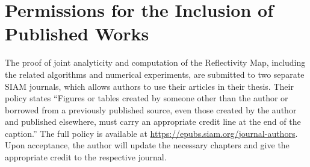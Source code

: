 \chapter{Permissions for the Inclusion of Published Works}
\label{Appendix C: Permission of Works}
\thispagestyle{pageonbottom}


The proof of joint analyticity and computation of the Reflectivity Map, including the related algorithms
and numerical experiments, are submitted to two separate SIAM journals, which allows authors to
use their articles in their thesis. Their policy states “Figures or tables created by someone other than the author or borrowed from a previously published source, even those created by the author and published elsewhere, must carry an appropriate credit line at the end of the caption.” The full policy is available at
\href{https://epubs.siam.org/journal-authors}{\color{blue}https://epubs.siam.org/journal-authors}. Upon acceptance, the author will update the necessary chapters and give the appropriate credit to the respective journal.